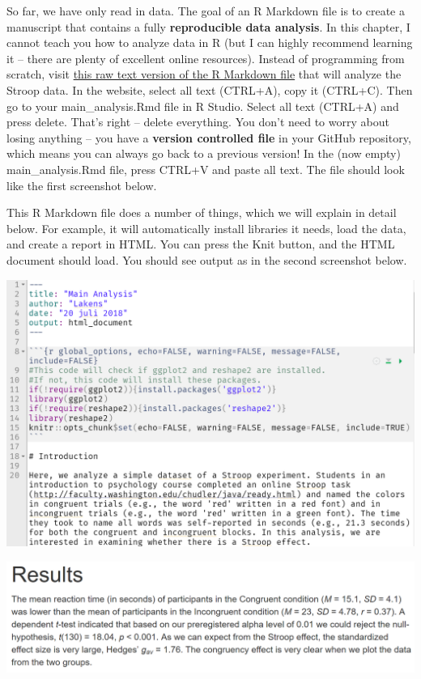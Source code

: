 \documentclass[
  oneside]{krantz}
\begin{document}
So far, we have only read in data. The goal of an R Markdown file is to create a manuscript that contains a fully \textbf{reproducible data analysis}. In this chapter, I cannot teach you how to analyze data in R (but I can highly recommend learning it -- there are plenty of excellent online resources). Instead of programming from scratch, visit \href{https://raw.githubusercontent.com/Lakens/reproducibility_assignment/master/main_analysis.Rmd}{this raw text version of the R Markdown file} that will analyze the Stroop data. In the website, select all text (CTRL+A), copy it (CTRL+C). Then go to your main\_analysis.Rmd file in R Studio. Select all text (CTRL+A) and press delete. That's right -- delete everything. You don't need to worry about losing anything -- you have a \textbf{version controlled file} in your GitHub repository, which means you can always go back to a previous version! In the (now empty) main\_analysis.Rmd file, press CTRL+V and paste all text. The file should look like the first screenshot below.

This R Markdown file does a number of things, which we will explain in detail
below. For example, it will automatically install libraries it needs, load the
data, and create a report in HTML. You can press the Knit button, and the HTML
document should load. You should see output as in the second screenshot below.

\begin{center}\includegraphics[width=1\linewidth]{images/23a19f01f3a23b3673656ee78860caf5} \end{center}

\begin{center}\includegraphics[width=1\linewidth]{images/79166b6bcc909e9e9e7fb0dd365fc8b2} \end{center}
\end{document}
